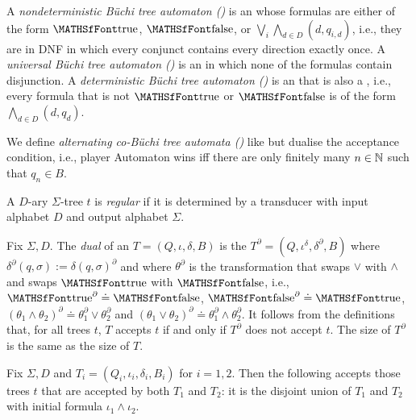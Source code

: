 

A \emph{nondeterministic B\"uchi tree automaton (\NBT)} is an \ABT whose formulas are either of the form $\true$, $\false$, or $\bigvee_i \bigwedge_{d \in D} (d,q_{i,d})$, i.e., they are in DNF in which every conjunct contains every direction exactly  once.
A \emph{universal B\"uchi tree automaton (\UBT)} is an \ABT in which none of the formulas contain disjunction.
A \emph{deterministic B\"uchi tree automaton (\DBT)} is an \NBT that is also a \UBT, i.e., every formula that is not $\true$ or $\false$ is of the form $\bigwedge_{d \in D} (d,q_d)$.

We define \emph{alternating co-B\"uchi tree automata (\ACT)} like \ABT but dualise the acceptance condition, i.e., player Automaton wins iff there are only finitely many $n \in \mathbb{N}$ such that $q_n \in B$.

A $D$-ary $\Sigma$-tree $t$ is \emph{regular} if it is determined by a transducer with input alphabet $D$ and output alphabet $\Sigma$.





\begin{fact} \label{fact:dual}
Fix $\Sigma,D$.
 The \emph{dual} of an \ABT $T = (Q,\iota,\delta,B)$ is the \ACT $T^\partial = (Q,\iota^\delta,\delta^\partial,B)$ where $\delta^\partial(q,\sigma) := \delta(q,\sigma)^\partial$ and where $\theta^\partial$ is the transformation that swaps $\vee$ with $\wedge$ and swaps $\true$ with $\false$, i.e., $\true^\partial \doteq \false$, $\false^\partial \doteq \true$, $(\theta_1 \wedge \theta_2)^\partial \doteq \theta_1^\partial \vee \theta_2^\partial$ and $(\theta_1 \vee \theta_2)^\partial \doteq \theta_1^\partial \wedge \theta_2^\partial$. It follows from the definitions that, for all trees $t$, $T$ accepts $t$ if and only if $T^\partial$ does not accept $t$. 
 The size of $T^\partial$ is the same as the size of $T$. 
\end{fact}

\begin{fact} \label{fact:intersection}
 Fix $\Sigma, D$ and \ABT $T_i = (Q_i,\iota_i,\delta_i,B_i)$ for $i = 1,2$. 
 Then the following \ABT accepts those trees $t$ that are accepted by both $T_1$ and $T_2$: it is the disjoint union of $T_1$ and $T_2$ with initial formula $\iota_1 \wedge \iota_2$.  
 \end{fact}


